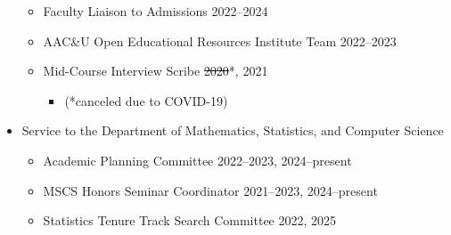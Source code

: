 \documentclass[margin]{res}
\begin{document}
\begin{resume}
\begin{itemize}
\begin{itemize}
		\item Faculty Liaison to Admissions \hfill 2022--2024 %
		
		\item AAC\&U Open Educational Resources Institute Team \hfill 2022--2023
		
		\item Mid-Course Interview Scribe \hfill \sout{2020}*, 2021 
			\begin{itemize}[leftmargin=-0in] \vspace{-0.2cm}
			\item[] \begin{footnotesize} (*canceled due to COVID-19) \end{footnotesize}
			\end{itemize}
		
		
		
		
		\end{itemize}
		
	\item Service to the Department of Mathematics, Statistics, and Computer Science
		\begin{itemize}
		
		\item Academic Planning Committee \hfill 2022--2023, 2024--present
		
		\item MSCS Honors Seminar Coordinator  \hfill 2021--2023, 2024--present %
		
		\item Statistics Tenure Track Search Committee \hfill 2022, 2025  
			

\end{itemize}
\end{itemize}
\end{resume}
\end{document}
